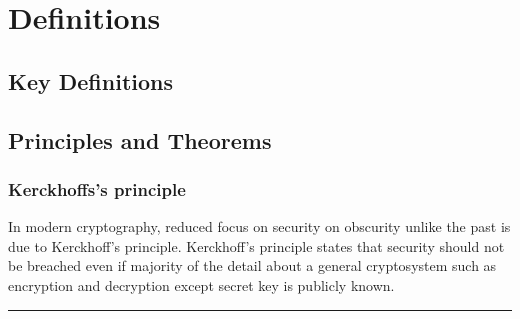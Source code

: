 \chapter{Definitions}
\section{Key Definitions}
\section{Principles and Theorems}
\subsection{Kerckhoffs’s principle}
In modern cryptography, reduced focus on security on obscurity unlike the past is due to Kerckhoff's principle. Kerckhoff's principle states that security should not be breached even if majority of the detail about a general cryptosystem such as encryption and decryption except secret key is publicly known.
\par\noindent\rule{\textwidth}{0.4pt}
\newpage